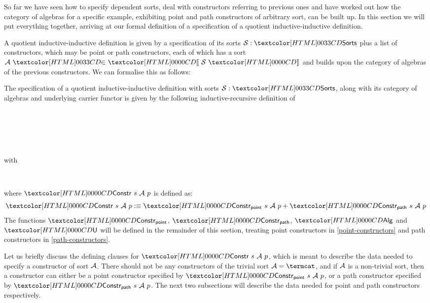 So far we have seen how to specify dependent sorts, deal with
constructors referring to previous ones and have worked out how the
category of algebras for a specific example, exhibiting point and path
constructors of arbitrary sort, can be built up. In this section we
will put everything together, arriving at our formal definition of a
specification of a quotient inductive-inductive definition.

A quotient inductive-inductive definition is given by a specification
of its sorts $\Ss : \sortsty$ plus a list of constructors, which may
be point or path constructors, each of which has a sort
$\sortsin{\Aa}{\SortCat{\Ss}}$ and builds upon the category of
algebras of the previous constructors. We can formalise this as
follows:

\begin{definition}
The specification of a quotient inductive-inductive definition with
sorts $\Ss : \sortsty$, along with its category of algebras and
underlying carrier functor is given by the following
inductive-recursive definition of
\begin{sorts}
  \sortnamety{\specty}{\Set} \\
   \\
  \functy{\Alg}{\specty \to \Cat} \\
   \\
\end{sorts}
% 
with
%
\begin{datatype}{\specty}{}
  \constr{\specnil}{\specty} \\
\end{datatype}
%
where $\Constr\ s\ \Aa\ p$ is defined as:
$$
\Constr\ s\ \Aa\ p \ddefeq \Constr_{\ident{point}}\ s\ \Aa\ p + \Constr_{\ident{path}}\ s\ \Aa\ p
$$
%
The functions $\Constr_{\ident{point}}$, $\Constr_{\ident{path}}$, $\Alg$ and $\Und$ will be
defined in the remainder of this section, treating point constructors
in \cref{point-constructors} and path constructors in \cref{path-constructors}.

\end{definition}

Let us briefly discuss the defining clauses for $\Constr\ s\ \Aa\ p$,
which is meant to describe the data needed to specify a constructor of
sort $\mathcal{A}$. There should not be any constructors of the trivial sort
$\Aa = \termcat$, and if $\mathcal{A}$ is a non-trivial sort, then a
constructor can either be a point constructor specified by
$\Constr_{\ident{point}}\ s\ \Aa\ p$, or a path constructor specified by
$\Constr_{\ident{path}}\ s\ \Aa\ p$. The next two subsections will describe the
data needed for point and path constructors respectively.

